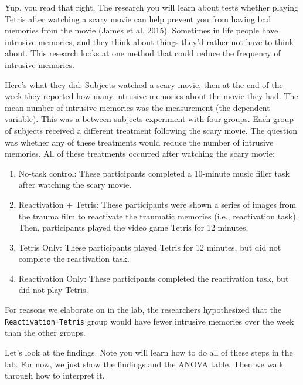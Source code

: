 \documentclass[
  letterpaper,
  DIV=11,
  numbers=noendperiod]{scrreprt}
\providecommand{\tightlist}{%
  \setlength{\itemsep}{0pt}\setlength{\parskip}{0pt}}\usepackage{longtable,booktabs,array}
\begin{document}
Yup, you read that right. The research you will learn about tests
whether playing Tetris after watching a scary movie can help prevent you
from having bad memories from the movie (James et al. 2015). Sometimes
in life people have intrusive memories, and they think about things
they'd rather not have to think about. This research looks at one method
that could reduce the frequency of intrusive memories.

Here's what they did. Subjects watched a scary movie, then at the end of
the week they reported how many intrusive memories about the movie they
had. The mean number of intrusive memories was the measurement (the
dependent variable). This was a between-subjects experiment with four
groups. Each group of subjects received a different treatment following
the scary movie. The question was whether any of these treatments would
reduce the number of intrusive memories. All of these treatments
occurred after watching the scary movie:

\begin{enumerate}
\def\labelenumi{\arabic{enumi}.}
\tightlist
\item
  No-task control: These participants completed a 10-minute music filler
  task after watching the scary movie.
\item
  Reactivation + Tetris: These participants were shown a series of
  images from the trauma film to reactivate the traumatic memories
  (i.e., reactivation task). Then, participants played the video game
  Tetris for 12 minutes.
\item
  Tetris Only: These participants played Tetris for 12 minutes, but did
  not complete the reactivation task.
\item
  Reactivation Only: These participants completed the reactivation task,
  but did not play Tetris.
\end{enumerate}

For reasons we elaborate on in the lab, the researchers hypothesized
that the \texttt{Reactivation+Tetris} group would have fewer intrusive
memories over the week than the other groups.

Let's look at the findings. Note you will learn how to do all of these
steps in the lab. For now, we just show the findings and the ANOVA
table. Then we walk through how to interpret it.
\end{document}
